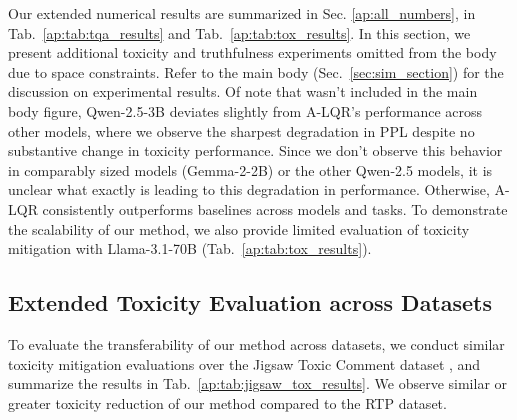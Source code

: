 \documentclass{article}
\theoremstyle{plain}
\theoremstyle{definition}
\theoremstyle{remark}
\begin{document}
Our extended numerical results are summarized in Sec. \ref{ap:all_numbers}, in Tab.~\ref{ap:tab:tqa_results} and Tab.~\ref{ap:tab:tox_results}. In this section, we present additional toxicity and truthfulness experiments omitted from the body due to space constraints. Refer to the main body (Sec.~\ref{sec:sim_section}) for the discussion on experimental results. Of note that wasn't included in the main body figure, Qwen-2.5-3B deviates slightly from A-LQR's performance across other models, where we observe the sharpest degradation in PPL despite no substantive change in toxicity performance. Since we don't observe this behavior in comparably sized models (Gemma-2-2B) or the other Qwen-2.5 models, it is unclear what exactly is leading to this degradation in performance. Otherwise, A-LQR consistently outperforms baselines across models and tasks. To demonstrate the scalability of our method, we also provide limited evaluation of toxicity mitigation with Llama-3.1-70B (Tab.~\ref{ap:tab:tox_results}). 

\subsection{Extended Toxicity Evaluation across Datasets}\label{ap:cross_dataset}
To evaluate the transferability of our method across datasets, we conduct similar toxicity mitigation evaluations over the Jigsaw Toxic Comment dataset \cite{jigsaw-toxic-comment-classification-challenge}, and summarize the results in Tab.~\ref{ap:tab:jigsaw_tox_results}. We observe similar or greater toxicity reduction of our method compared to the RTP dataset.
\end{document}
